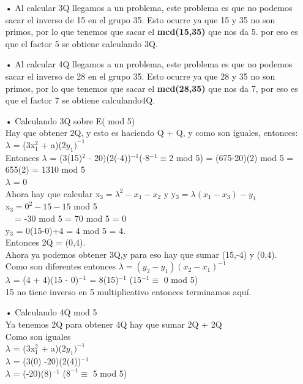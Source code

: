 \documentclass[10pt,a4paper]{article}
\begin{document}
\begin{enumerate}
\begin{itemize}
\begin{itemize}
\item[•] Al calcular 3Q llegamos a un problema, este problema es que no podemos sacar el inverso de 15 en el grupo 35. Esto ocurre ya que 15 y 35 no son primos, por lo que tenemos que sacar el \textbf{mcd(15,35)} que nos da 5. por eso es que el factor 5 se obtiene calculando 3Q.
\\
\item[•] Al calcular 4Q llegamos a un problema, este problema es que no podemos sacar el inverso de 28 en el grupo 35. Esto ocurre ya que 28 y 35 no son primos, por lo que tenemos que sacar el \textbf{mcd(28,35)}  que nos da 7, por eso es que el factor 7 se obtiene calculando4Q.\\
\item[•] Calculando 3Q sobre E( mod 5)
\\Hay que obtener 2Q, y esto es haciendo Q + Q, y como son iguales, entonces:\\ $\lambda$ = (3x$_{1}^{2}$ + a)(2$y_{1})^{-1}$ 
\\Entonces $\lambda$ = (3(15)$^{2}$ - 20)(2(-4))$^{-1}$(-8$^{-1} \equiv $2 mod 5) = (675-20)(2) mod 5 = 655(2) = 1310 mod 5\\
$\lambda$ = 0 \\
Ahora hay que calcular x$_{3} = \lambda ^{2}- x_{1}- x_{2}$ y y$_{3} = \lambda(x_{1} - x_{3})-y_{1}$
\\x$_{3} = 0^{2}-15-15$ mod 5 
\\$~~~~~$= -30 mod 5 = 70 mod 5 = 0
\\y$_{3}$ = 0(15-0)+4 = 4 mod 5 = 4.
\\Entonces 2Q = (0,4).
\\Ahora ya podemos obtener 3Q,y para eso hay que sumar (15,-4) y (0,4).
\\Como son diferentes entonces $\lambda = (y_{2} - y_{1})(x_{2} - x_{1})^{-1}$
\\$\lambda$ = (4 + 4)(15 - 0)$^{-1}$ = 8(15)$^{-1}$ (15$^{-1} \equiv$ 0 mod 5) 
\\15 no tiene inverso en 5 multiplicativo entonces terminamos aquí.
\item[•] Calculando 4Q mod 5
\\Ya tenemos 2Q para obtener 4Q hay que sumar 2Q + 2Q 
\\Como son iguales 
\\$\lambda$ = (3x$_{1}^{2}$ + a)(2$y_{1})^{-1}$
\\$\lambda$ = (3(0) -20)(2(4))$^{-1}$
\\$\lambda$ = (-20)(8)$^{-1}$ ($8^{-1} \equiv$ 5 mod 5)

\end{itemize}
\end{itemize}
\end{enumerate}
\end{document}
